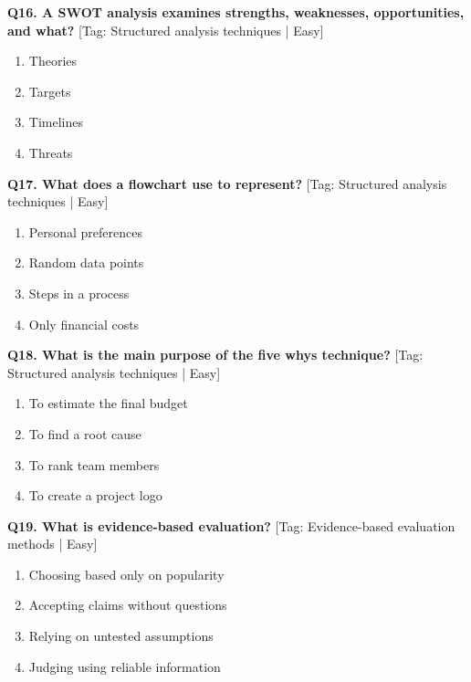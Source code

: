 \noindent\textbf{Q16. A SWOT analysis examines strengths, weaknesses, opportunities, and what?} \hfill [Tag: Structured analysis techniques | Easy]
\begin{enumerate}[label=(\alph*),topsep=2pt,itemsep=1pt,partopsep=0pt,parsep=0pt]
    \item {Theories}
    \item {Targets}
    \item {Timelines}
    \item {Threats}
\end{enumerate}
\vspace{2mm}

\noindent\textbf{Q17. What does a flowchart use to represent?} \hfill [Tag: Structured analysis techniques | Easy]
\begin{enumerate}[label=(\alph*),topsep=2pt,itemsep=1pt,partopsep=0pt,parsep=0pt]
    \item {Personal preferences}
    \item {Random data points}
    \item {Steps in a process}
    \item {Only financial costs}
\end{enumerate}
\vspace{2mm}

\noindent\textbf{Q18. What is the main purpose of the five whys technique?} \hfill [Tag: Structured analysis techniques | Easy]
\begin{enumerate}[label=(\alph*),topsep=2pt,itemsep=1pt,partopsep=0pt,parsep=0pt]
    \item {To estimate the final budget}
    \item {To find a root cause}
    \item {To rank team members}
    \item {To create a project logo}
\end{enumerate}
\vspace{2mm}

\noindent\textbf{Q19. What is evidence-based evaluation?} \hfill [Tag: Evidence-based evaluation methods | Easy]
\begin{enumerate}[label=(\alph*),topsep=2pt,itemsep=1pt,partopsep=0pt,parsep=0pt]
    \item {Choosing based only on popularity}
    \item {Accepting claims without questions}
    \item {Relying on untested assumptions}
    \item {Judging using reliable information}
\end{enumerate}
\vspace{2mm}

